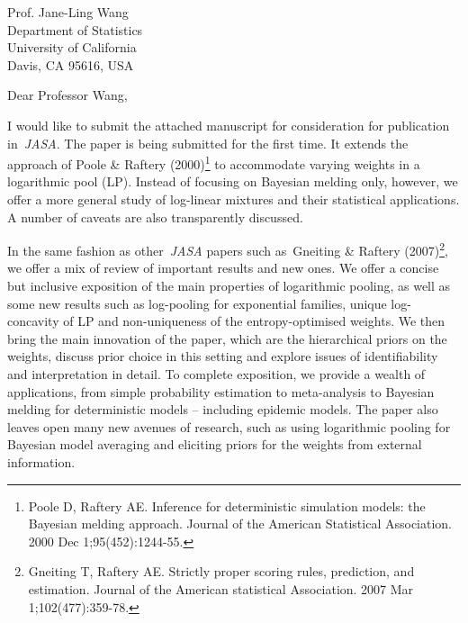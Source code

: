 \documentclass[11pt, a4paper]{letter} %
\begin{document}

\begin{letter}{
	Prof. Jane-Ling Wang\\
	Department of Statistics\\
	University of California\\
	Davis, CA 95616, USA
}


\opening{Dear Professor Wang,}

I would like to submit the attached manuscript for consideration for publication in~\textit{JASA}.
The paper is being submitted for the first time.
It extends the approach of Poole \& Raftery (2000)\footnote{Poole D, Raftery AE. Inference for deterministic simulation models: the Bayesian melding approach. Journal of the American Statistical Association. 2000 Dec 1;95(452):1244-55.} to accommodate varying weights in a logarithmic pool (LP).
Instead of focusing on Bayesian melding only, however, we offer a more general study of log-linear mixtures and their statistical applications.
A number of caveats are also transparently discussed.

In the same fashion as other~\textit{JASA} papers such as~Gneiting \& Raftery (2007)\footnote{Gneiting T, Raftery AE. Strictly proper scoring rules, prediction, and estimation. Journal of the American statistical Association. 2007 Mar 1;102(477):359-78.}, we offer a mix of review of important results and new ones.
We offer a concise but inclusive exposition of the main properties of logarithmic pooling, as well as some new results such as log-pooling for exponential families, unique log-concavity of LP and non-uniqueness of the entropy-optimised weights.
We then bring the main innovation of the paper, which are the hierarchical priors on the weights, discuss prior choice in this setting and explore issues of identifiability and interpretation in detail.
To complete exposition, we provide a wealth of applications, from simple probability estimation to meta-analysis to Bayesian melding for deterministic models -- including epidemic models.
The paper also leaves open many new avenues of research, such as using logarithmic pooling for Bayesian model averaging and eliciting priors for the weights from external information.


\end{letter}
\end{document}
